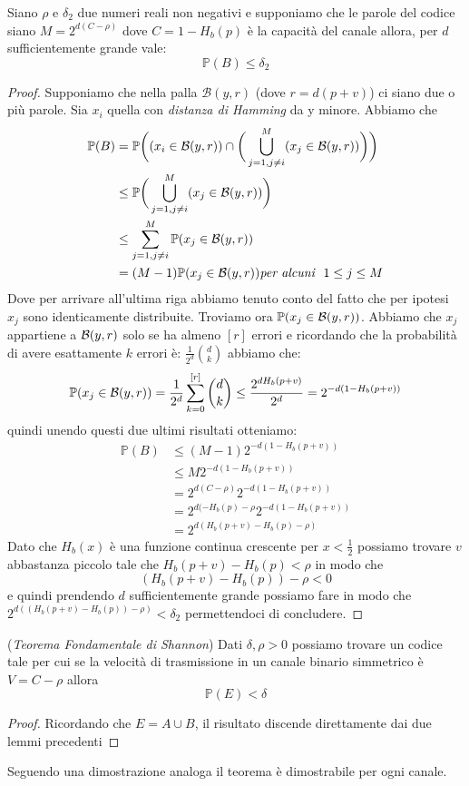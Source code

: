 \begin{lem}
Siano $\rho$ e $\delta_2$ due numeri reali non negativi e supponiamo che le parole del codice siano $M=2^{d(C-\rho)}$ dove $C=1-H_b(p)$ è la capacità del canale allora, per $d$ sufficientemente grande vale:
$$\mathbb{P}(B)\leq \delta_2$$
\end{lem}
\begin{proof}
Supponiamo che nella palla $\mathcal{B}(y,r)$ (dove $r=d(p+v)$) ci siano due o più parole. Sia $x_i$ quella con \textit{distanza di Hamming} da y minore. Abbiamo che
\[
\begin{split}
\mathbb{P}(B)&=\mathbb{P}\bigg( (x_i\in \mathcal{B}(y,r)) \cap \bigg( \bigcup_{j=1,j\neq i}^M (x_j \in \mathcal{B}(y,r) ) \bigg) \bigg)\\
&\leq \mathbb{P}\bigg( \bigcup_{j=1,j\neq i}^M (x_j \in \mathcal{B}(y,r) ) \bigg)\\
& \leq \sum_{j=1,j\neq i}^M \mathbb{P}(x_j\in \mathcal{B}(y,r))\\
&= (M-1) \mathbb{P}(x_j \in \mathcal{B}(y,r) ) \textit{per alcuni } \ 1\leq j \leq M
\end{split}
\]
Dove per arrivare all'ultima riga abbiamo tenuto conto del fatto che per ipotesi $x_j$ sono identicamente distribuite.
Troviamo ora $\mathbb{P}(x_j\in \mathcal{B}(y,r))$. Abbiamo che $x_j$ appartiene a $\mathcal{B}(y,r)$ solo se ha almeno $[r]$ errori e ricordando che la probabilità di avere esattamente $k$ errori è: $\frac{1}{2^d} {d \choose k}$ abbiamo che:
$$\mathbb{P}(x_j\in \mathcal{B}(y,r))=\frac{1}{2^d} \sum_{k=0}^{[r]} {d \choose k}\leq \frac{2^{dH_b(p+v)}}{2^d}=2^{-d(1-H_b(p+v))}$$
quindi unendo questi due ultimi risultati otteniamo:
\[
\begin{split}
\mathbb{P}(B) &\leq (M-1)2^{-d(1-H_b(p+v))}\\
&\leq M2^{-d(1-H_b(p+v))}\\
& = 2^{d(C-\rho)}2^{-d(1-H_b(p+v))}\\
& = 2^{d(-H_b(p)-\rho}2^{-d(1-H_b(p+v))}\\
& =2^{d(H_b(p+v)-H_b(p)-\rho)}
\end{split}
\]
Dato che $H_b(x)$ è una funzione continua crescente per $x< \frac{1}{2} $ possiamo trovare $v$ abbastanza piccolo tale che $H_b(p+v)-H_b(p)<\rho$ in modo che 
$$(H_b(p+v)-H_b(p))-\rho < 0$$
e quindi prendendo $d$ sufficientemente grande possiamo fare in modo che $2^{d((H_b(p+v)-H_b(p))-\rho )}<\delta_2$ permettendoci di concludere.
\end{proof}


\begin{teo} (\textit{Teorema Fondamentale di Shannon})
Dati $\delta , \rho > 0$ possiamo trovare un codice tale per cui se la velocità di trasmissione in un canale binario simmetrico è $V=C-\rho$ allora
$$\mathbb{P}(E)< \delta$$
\end{teo}
\begin{proof}
Ricordando che $E=A\cup B$, il risultato discende direttamente dai due lemmi precedenti
\end{proof}
Seguendo una dimostrazione analoga il teorema è dimostrabile per ogni canale.





